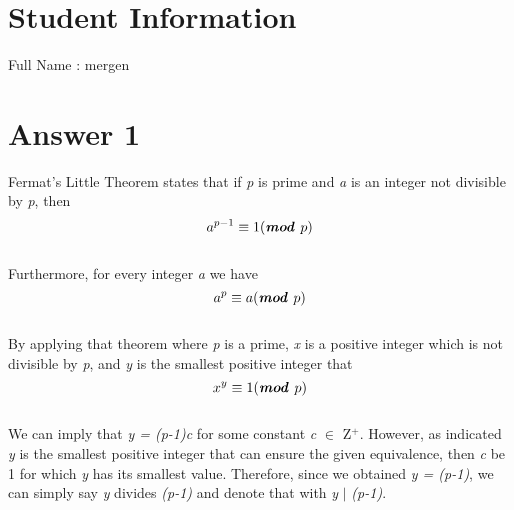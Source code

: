 \documentclass[12pt]{article}
\begin{document}
\section*{Student Information } 
Full Name : mergen \\

\section*{Answer 1}
Fermat's Little Theorem states that if \textit{p} is prime and \textit{a} is an integer not divisible by \textit{p}, then\\
\hspace*{1cm} \[a^{p-1}\equiv 1 (\textbf{\textit{mod} } p)\] \\
Furthermore, for every integer \textit{a} we have\\
\hspace*{1cm} \[a^{p}\equiv a (\textbf{\textit{mod} } p)\] \\
By applying that theorem where \textit{p} is a prime, \textit{x} is a positive integer which is not divisible by \textit{p}, and \textit{y} is the smallest positive integer that \[x^{y}\equiv 1 (\textbf{\textit{mod} } p)\]\\
We can imply that \textit{y = (p-1)c} for some constant \textit{c} $\in$ Z$^{+}$. However, as indicated \textit{y} is the smallest positive integer that can ensure the given equivalence, then \textit{c} be 1 for which \textit{y} has its smallest value. Therefore, since we obtained \textit{y = (p-1)}, we can simply say \textit{y} divides \textit{(p-1)} and denote that with \textit{y} $\mid$ \textit{(p-1)}. \\
\end{document}
